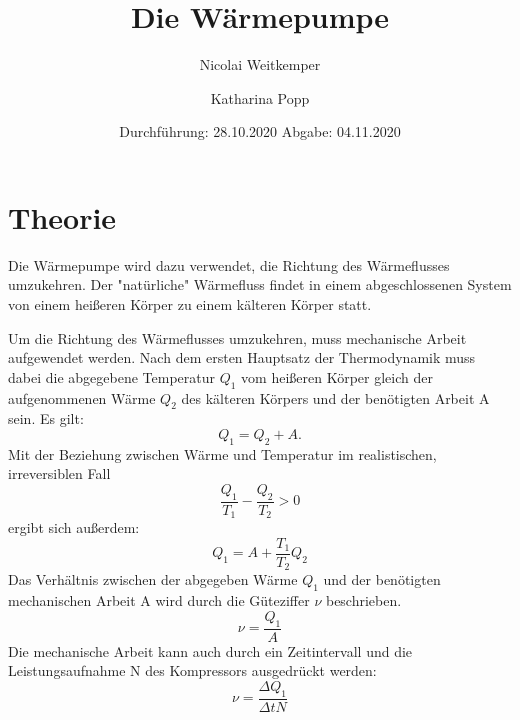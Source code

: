 

\subject{D206}
\title{Die Wärmepumpe}
\author{Nicolai Weitkemper \and Katharina Popp}
\date{
    Durchführung: 28.10.2020
    \hspace{3em}
    Abgabe: 04.11.2020
}



\maketitle
\thispagestyle{empty}
\tableofcontents
\newpage

\section{Theorie} \label{sec:Theorie}

    Die Wärmepumpe wird dazu verwendet, die Richtung des Wärmeflusses umzukehren.
    Der "natürliche" Wärmefluss findet in einem abgeschlossenen System von einem heißeren Körper
    zu einem kälteren Körper statt.

    Um die Richtung des Wärmeflusses umzukehren, muss mechanische Arbeit aufgewendet werden.
    Nach dem ersten Hauptsatz der Thermodynamik muss dabei die abgegebene Temperatur $Q_1$ vom heißeren Körper
    gleich der aufgenommenen Wärme $Q_2$ des kälteren Körpers und der benötigten Arbeit A sein.
    Es gilt:
    \begin{equation}
        Q_1 = Q_2 + A .
    \end{equation}
    Mit der Beziehung zwischen Wärme und Temperatur im realistischen, irreversiblen Fall
    \begin{equation}
        \frac{Q_1}{T_1} - \frac{Q_2}{T_2} > 0
    \end{equation}
    ergibt sich außerdem:
    \begin{equation}
        Q_1 = A + \frac{T_1}{T_2} Q_2
    \end{equation}
    Das Verhältnis zwischen der abgegeben Wärme $Q_1$ und der benötigten mechanischen Arbeit A wird durch die Güteziffer $\nu$
    beschrieben.
    \begin{equation}
        \nu = \frac{Q_1}{A}
    \end{equation}
    Die mechanische Arbeit kann auch durch ein Zeitintervall und die Leistungsaufnahme N des Kompressors ausgedrückt werden:
    \begin{equation}
        \nu = \frac{\Delta Q_1}{\Delta t N}
    \end{equation}


